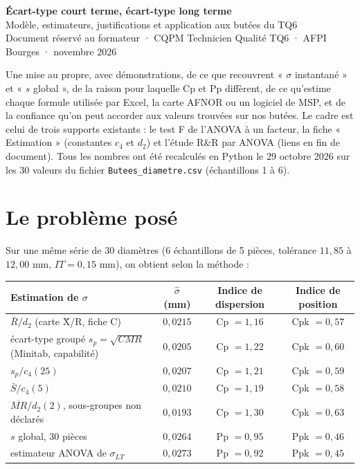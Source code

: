\documentclass[11pt,a4paper]{article}
\theoremstyle{tq}
\theoremstyle{remark}
\newcommand{\Rb}{\bar{R}}
\begin{document}
\begin{tcolorbox}[colback=uimmblue,colframe=uimmblue,coltext=white,arc=2pt]
{\LARGE\bfseries Écart-type court terme, écart-type long terme}\\[3pt]
{\large Modèle, estimateurs, justifications et application aux butées du TQ6}\\[3pt]
{\small Document réservé au formateur · CQPM Technicien Qualité TQ6 · AFPI Bourges · novembre 2026}
\end{tcolorbox}

\begin{cle}
Une mise au propre, avec démonstrations, de ce que recouvrent « $\sigma$ instantané » et « $s$ global », de la raison pour laquelle Cp et Pp diffèrent, de ce qu'estime chaque formule utilisée par Excel, la carte AFNOR ou un logiciel de MSP, et de la confiance qu'on peut accorder aux valeurs trouvées sur nos butées. Le cadre est celui de trois supports existants : le test F de l'ANOVA à un facteur, la fiche « Estimation » (constantes $c_4$ et $d_2$) et l'étude R\&R par ANOVA (liens en fin de document). Tous les nombres ont été recalculés en Python le 29 octobre 2026 sur les 30 valeurs du fichier \texttt{Butees\_diametre.csv} (échantillons 1 à 6).
\end{cle}

\tableofcontents
\vspace{4pt}

\section{Le problème posé}

Sur une même série de 30 diamètres (6 échantillons de 5 pièces, tolérance $11{,}85$ à $12{,}00$ mm, $IT = 0{,}15$ mm), on obtient selon la méthode :

\begin{center}\small
\begin{tabular}{@{}lccc@{}}
\toprule
Estimation de $\sigma$ & $\hat\sigma$ (mm) & Indice de dispersion & Indice de position \\
\midrule
$\Rb/d_2$ (carte X̄/R, fiche C) & $0{,}0215$ & Cp $= 1{,}16$ & Cpk $= 0{,}57$\\
écart-type groupé $s_p = \sqrt{CMR}$ (Minitab, capabilité) & $0{,}0205$ & Cp $= 1{,}22$ & Cpk $= 0{,}60$\\
$s_p / c_4(25)$ & $0{,}0207$ & Cp $= 1{,}21$ & Cpk $= 0{,}59$\\
$\bar S / c_4(5)$ & $0{,}0210$ & Cp $= 1{,}19$ & Cpk $= 0{,}58$\\
$\overline{MR}/d_2(2)$, sous-groupes non déclarés & $0{,}0193$ & Cp $= 1{,}30$ & Cpk $= 0{,}63$\\
\midrule
$s$ global, 30 pièces & $0{,}0264$ & Pp $= 0{,}95$ & Ppk $= 0{,}46$\\
estimateur ANOVA de $\sigma_{LT}$ & $0{,}0273$ & Pp $= 0{,}92$ & Ppk $= 0{,}45$\\
\bottomrule
\end{tabular}
\end{center}
\end{document}
